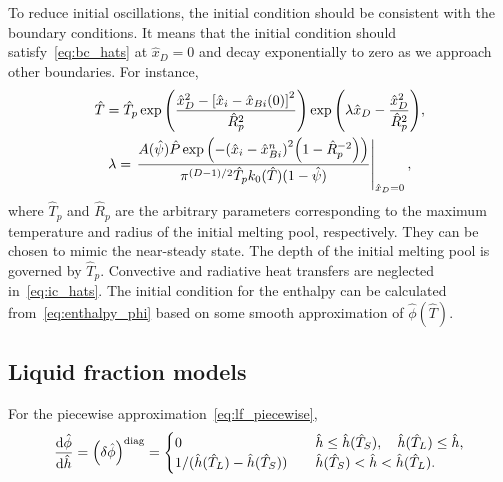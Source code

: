 \documentclass{article}
\newcommand{\diag}[1]{\qty(#1)^\mathrm{diag}}
\newcommand{\Hx}{\hat{x}}
\newcommand{\Hh}{\hat{h}}
\newcommand{\HT}{\hat{T}}
\newcommand{\HP}{\hat{P}}
\newcommand{\Hphi}{\hat{\phi}}
\newcommand{\Hpsi}{\hat{\psi}}
\newcommand{\HR}{\hat{R}}
\begin{document}
To reduce initial oscillations, the initial condition should be consistent with the boundary conditions.
It means that the initial condition should satisfy~\eqref{eq:bc_hats} at \(\Hx_D=0\)
and decay exponentially to zero as we approach other boundaries.
For instance,
\begin{gather}
    \HT = \HT_p\exp\qty( \frac{\Hx_D^2 - \qty[\Hx_i-\Hx_{Bi}(0)]^2}{\HR_p^2} )
        \exp\qty(\lambda \Hx_D - \frac{\Hx_D^2}{\HR_p^2}), \label{eq:ic_hats}\\
    \lambda = \eval{ \frac{A(\Hpsi)\HP\exp\qty( -\qty(\Hx_i-\Hx_{Bi}^n)^2\qty(1-\HR_p^{-2}) )}
        {\pi^{(D-1)/2}\HT_p k_0(\HT)(1-\Hpsi)} }_{\Hx_D=0}, \label{eq:lambda}
\end{gather}
where \(\HT_p\) and \(\HR_p\) are the arbitrary parameters corresponding
to the maximum temperature and radius of the initial melting pool, respectively.
They can be chosen to mimic the near-steady state.
The depth of the initial melting pool is governed by \(\HT_p\).
Convective and radiative heat transfers are neglected in~\eqref{eq:ic_hats}.
The initial condition for the enthalpy can be calculated from~\eqref{eq:enthalpy_phi}
based on some smooth approximation of \(\Hphi(\HT)\).

\subsection{Liquid fraction models}

For the piecewise approximation~\eqref{eq:lf_piecewise},
\begin{equation}
	\dv{\Hphi}{\Hh} = \diag{\var{\Hphi}} = \begin{cases}
        0 & \quad \Hh \leq \Hh(\HT_S), \quad \Hh(\HT_L) \leq \Hh, \\
        1/(\Hh(\HT_L)-\Hh(\HT_S)) & \quad \Hh(\HT_S) < \Hh < \Hh(\HT_L). \\
    \end{cases} \label{eq:pert_phi_h_diag}
\end{equation}
\end{document}
